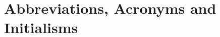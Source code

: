 \chapteropen
\chapter{Abbreviations, Acronyms and Initialisms}
\glsaddall
\vspace{-25pt}%

\AllAcronymSections








